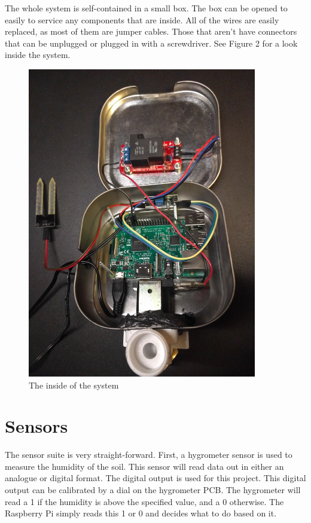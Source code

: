 \documentclass[11pt] {article}
\begin{document}
The whole system is self-contained in a small box. The box can be opened to easily to service any components that are
inside. All of the wires are easily replaced, as most of them are jumper cables. Those that aren't have connectors that
can be unplugged or plugged in with a screwdriver. See Figure 2 for a look inside the system.

\begin{figure}[H]
    \begin{centering}
        \includegraphics[width=10cm]{../img/the-guts}
        \caption{The inside of the system}
    \end{centering}
    \label{guts}
\end{figure}

\section{Sensors}
The sensor suite is very straight-forward. First, a hygrometer sensor is used to measure the humidity of the soil. This
sensor will read data out in either an analogue or digital format. The digital output is used for this project. This
digital output can be calibrated by a dial on the hygrometer PCB. The hygrometer will read a 1 if the humidity is above
the specified value, and a 0 otherwise. The Raspberry Pi simply reads this 1 or 0 and decides what to do based on it.
\end{document}

